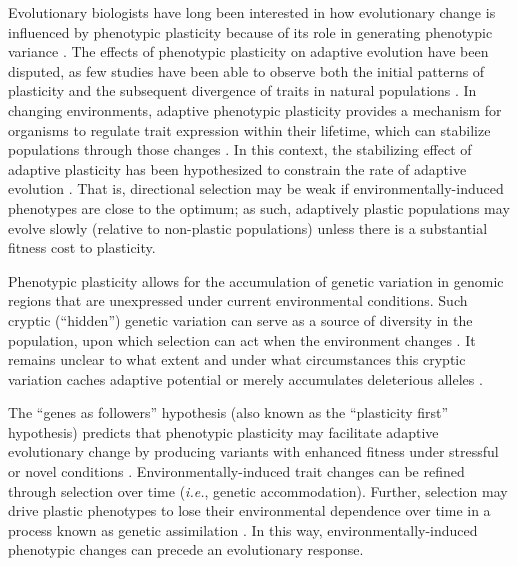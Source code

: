 Evolutionary biologists have long been interested in how evolutionary change is influenced by phenotypic plasticity because of its role in generating phenotypic variance \citep{gibert_phenotypic_2019}.
The effects of phenotypic plasticity on adaptive evolution have been disputed, as few studies have been able to observe both the initial patterns of plasticity and the subsequent divergence of traits in natural populations \citep{ghalambor_adaptive_2007,wund_assessing_2012,forsman_rethinking_2015,ghalambor_non-adaptive_2015,hendry_key_2016}.
In changing environments, adaptive phenotypic plasticity provides a mechanism for organisms to regulate trait expression within their lifetime, which can stabilize populations through those changes \citep{gibert_phenotypic_2019}.
In this context, the stabilizing effect of adaptive plasticity has been hypothesized to constrain the rate of adaptive evolution \citep{gupta_study_1982,ancel_undermining_2000,huey_behavioral_2003,price_role_2003,paenke_influence_2007}.
That is, directional selection may be weak if environmentally-induced phenotypes are close to the optimum; as such, adaptively plastic populations may evolve slowly (relative to non-plastic populations) unless there is a substantial fitness cost to plasticity.



Phenotypic plasticity allows for the accumulation of genetic variation in genomic regions that are unexpressed under current environmental conditions.
Such cryptic (``hidden'') genetic variation can serve as a source of diversity in the population, upon which selection can act when the environment changes \citep{schlichting_hidden_2008,levis_evaluating_2016}.  
It remains unclear to what extent and under what circumstances this cryptic variation caches adaptive potential or merely accumulates deleterious alleles \citep{gibson_uncovering_2004,paaby_cryptic_2014,zheng_cryptic_2019}.

The ``genes as followers'' hypothesis (also known as the ``plasticity first'' hypothesis) predicts that phenotypic plasticity may facilitate adaptive evolutionary change by producing variants with enhanced fitness under stressful or novel conditions \citep{west-eberhard_developmental_2003,schwander_genes_2011,levis_evaluating_2016}. 
Environmentally-induced trait changes can be refined through selection over time (\textit{i.e.}, genetic accommodation).
Further, selection may drive plastic phenotypes to lose their environmental dependence over time in a process known as genetic assimilation \citep{west-eberhard_developmental_2005,pigliucci_phenotypic_2006,crispo_baldwin_2007,schlichting_phenotypic_2014,levis_evaluating_2016}. 
In this way, environmentally-induced phenotypic changes can precede an evolutionary response.

